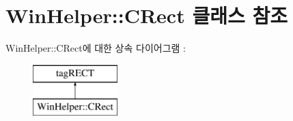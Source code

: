 \hypertarget{class_win_helper_1_1_c_rect}{}\section{Win\+Helper\+:\+:C\+Rect 클래스 참조}
\label{class_win_helper_1_1_c_rect}
Win\+Helper\+:\+:C\+Rect에 대한 상속 다이어그램 \+: \begin{figure}[H]
\begin{center}
\leavevmode
\includegraphics[height=2.000000cm]{class_win_helper_1_1_c_rect}
\end{center}
\end{figure}
